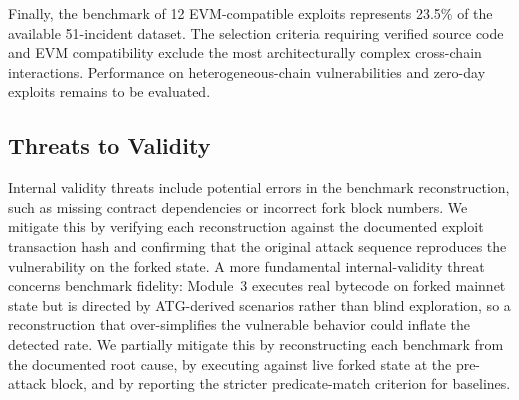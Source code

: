\documentclass[journal]{IEEEtran}
\begin{document}
Finally, the benchmark of 12 EVM-compatible exploits represents 23.5\% of the available 51-incident dataset. The selection criteria requiring verified source code and EVM compatibility exclude the most architecturally complex cross-chain interactions. Performance on heterogeneous-chain vulnerabilities and zero-day exploits remains to be evaluated.

\subsection{Threats to Validity}

Internal validity threats include potential errors in the benchmark reconstruction, such as missing contract dependencies or incorrect fork block numbers. We mitigate this by verifying each reconstruction against the documented exploit transaction hash and confirming that the original attack sequence reproduces the vulnerability on the forked state. A more fundamental internal-validity threat concerns benchmark fidelity: Module~3 executes real bytecode on forked mainnet state but is directed by ATG-derived scenarios rather than blind exploration, so a reconstruction that over-simplifies the vulnerable behavior could inflate the detected rate. We partially mitigate this by reconstructing each benchmark from the documented root cause, by executing against live forked state at the pre-attack block, and by reporting the stricter predicate-match criterion for baselines.
\end{document}
